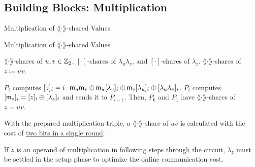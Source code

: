 \documentclass[../240906_cryptlab_flute.tex]{subfiles}
\begin{document}
\subsection{Building Blocks: Multiplication}
\begin{frame}{Multiplication of \(\lang\cdot\rang\)-shared Values}

    \begin{block}{Multiplication of \(\lang\cdot\rang\)-shared Values}
        \begin{description}[Output]
            \small
            \ii[Input]
            \(\lang\cdot\rang\)-shares of \(u, v \in \mathbb{Z}_2\),
            \([\cdot]\)-shares of \(\lambda_u \lambda_v\),
            and \([\cdot]\)-shares of \(\lambda_z\).
            \ii[Output]
            \(\lang\cdot\rang\)-shares of \(z \coloneqq uv\).
        \end{description}
        \pause
        \begin{enumerate}
            \ii
            \(P_i\) computes \([z]_i = i \cdot \mathsf{m}_u \mathsf{m}_v
            \oplus \mathsf{m}_u[\lambda_v]_i \oplus \mathsf{m}_v [\lambda_u]_i \oplus [\lambda_u \lambda_v]_i\).
            \pause
            \ii
            \(P_i\) computes \([\mathsf{m}_z]_i = [z]_i \oplus [\lambda_z]_i\)
            and sends it to \(P_{i-1}\).
            \ii
            Then, \(P_0\) and \(P_1\) have \(\lang\cdot\rang\)-shares of \(z = uv\).
        \end{enumerate}
        \pause
        With the prepared multiplication triple,
        a \(\lang\cdot\rang\)-share of \(uv\) is calculated with the cost of \ul{two bits in a single round}.
    \end{block}

    \begin{alertblock}{}
        If \(z\) is an operand of multiplication in following steps through the circuit,
        \(\lambda_z\) must be settled in the setup phase to optimize the online communication cost.
    \end{alertblock}
\end{frame}
\end{document}
